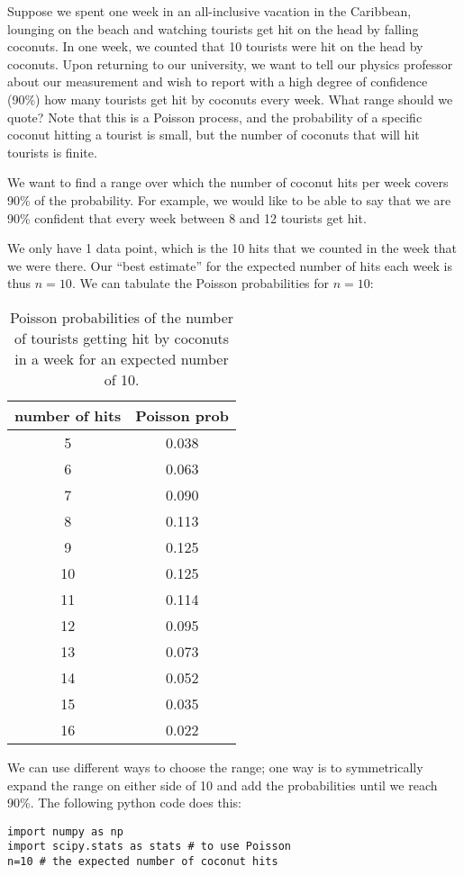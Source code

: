 \begin{example}{}{Suppose we spent one week in an all-inclusive vacation in the Caribbean, lounging on the beach and watching tourists get hit on the head by falling coconuts. In one week, we counted that 10 tourists were hit on the head by coconuts. Upon returning to our university, we want to tell our physics professor about our measurement and wish to report with a high degree of confidence (90\%) how many tourists get hit by coconuts every week. What range should we quote?}{}
\label{ex:PoissonCoconut}
Note that this is a Poisson process, and the probability of a specific coconut hitting a tourist is small, but the number of coconuts that will hit tourists is finite.

We want to find a range over which the number of coconut hits per week covers 90\% of the probability. For example, we would like to be able to say that we are 90\% confident that every week between 8 and 12 tourists get hit. 

We only have 1 data point, which is the 10 hits that we counted in the week that we were there. Our ``best estimate'' for the expected number of hits each week is thus $n=10$. We can tabulate the Poisson probabilities for $n=10$:

\begin{table}[h!]
\begin{tabular}{|c|c|}
\hline
number of hits & Poisson prob\\
\hline
5 & 0.038 \\
\hline
6 & 0.063 \\
\hline
7 & 0.090 \\
\hline
8 & 0.113 \\
\hline
9 & 0.125 \\
\hline
\cellcolor{gray!25} 10 & \cellcolor{gray!25} 0.125 \\
\hline
11 & 0.114 \\
\hline
12 & 0.095 \\
\hline
13 & 0.073 \\
\hline
14 & 0.052 \\
\hline
15 & 0.035 \\
\hline
16 & 0.022 \\
\hline
\end{tabular}
\caption{Poisson probabilities of the number of tourists getting hit by coconuts in a week for an expected number of 10.}
\end{table}

We can use different ways to choose the range; one way is to symmetrically expand the range on either side of 10 and add the probabilities until we reach 90\%. The following python code does this:
\begin{lstlisting}[frame=single] 
import numpy as np
import scipy.stats as stats # to use Poisson
n=10 # the expected number of coconut hits


\end{lstlisting}
\end{example}
